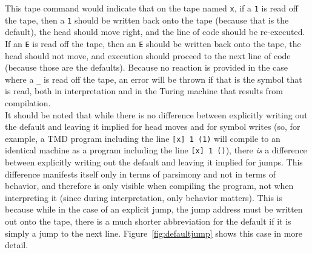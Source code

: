 \documentclass[11pt]{article}
\begin{document}
This tape command would indicate that on the tape named \texttt{x}, if a \texttt{1} is read off the tape, then a \texttt{1} should be written back onto the tape (because that is the default), the head should move right, and the line of code should be re-executed. If an \texttt{E} is read off the tape, then an \texttt{E} should be written back onto the tape, the head should not move, and execution should proceed to the next line of code (because those are the defaults). Because no reaction is provided in the case where a \texttt{\_} is read off the tape, an error will be thrown if that is the symbol that is read, both in interpretation and in the Turing machine that results from compilation. \\

It should be noted that while there is no difference between explicitly writing out the default and leaving it implied for head moves and for symbol writes (so, for example, a TMD program including the line \texttt{[x] 1 (1)} will compile to an identical machine as a program including the line \texttt{[x] 1 ()}), there \emph{is} a difference between explicitly writing out the default and leaving it implied for jumps. This difference manifests itself only in terms of parsimony and not in terms of behavior, and therefore is only visible when compiling the program, not when interpreting it (since during interpretation, only behavior matters). This is because while in the case of an explicit jump, the jump address must be written out onto the tape, there is a much shorter abbreviation for the default if it is simply a jump to the next line. Figure~\ref{fig:defaultjump} shows this case in more detail.
\end{document}
